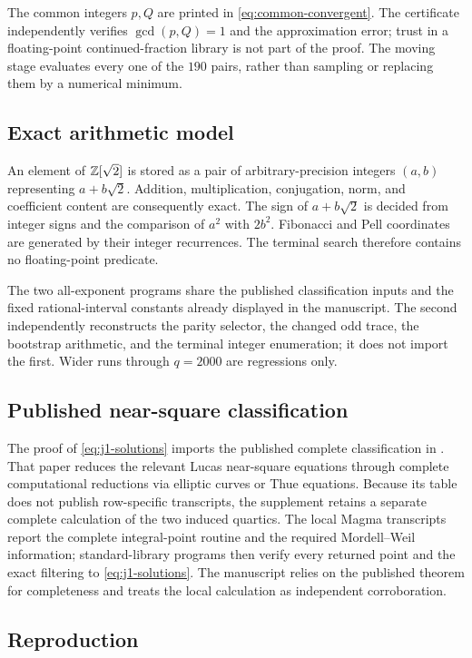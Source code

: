 The common integers $p,Q$ are printed in \cref{eq:common-convergent}. The
certificate independently verifies $\gcd(p,Q)=1$ and the approximation error;
trust in a floating-point continued-fraction library is not part of the proof.
The moving stage evaluates every one of the $190$ pairs, rather than sampling
or replacing them by a numerical minimum.

\subsection{Exact arithmetic model}

An element of $\mathbb{Z}[\sqrt2]$ is stored as a pair of arbitrary-precision
integers $(a,b)$ representing $a+b\sqrt2$. Addition, multiplication,
conjugation, norm, and coefficient content are consequently exact. The sign
of $a+b\sqrt2$ is decided from integer signs and the comparison of $a^2$
with $2b^2$. Fibonacci and Pell coordinates are generated by their integer
recurrences. The terminal search therefore contains no floating-point
predicate.

The two all-exponent programs share the published classification inputs and
the fixed rational-interval constants already displayed in the manuscript.
The second independently reconstructs the parity selector, the changed odd
trace, the bootstrap arithmetic, and the terminal integer enumeration; it
does not import the first. Wider runs through $q=2000$ are regressions only.

\subsection{Published near-square classification}

The proof of \cref{eq:j1-solutions} imports the published complete
classification in \cite[Table~1]{AlekseyevTengely2014}. That paper reduces
the relevant Lucas near-square equations through complete computational
reductions via elliptic curves or Thue equations. Because its table does not
publish row-specific transcripts,
the supplement retains a separate complete calculation of the two induced
quartics. The local Magma transcripts report the complete integral-point
routine and the required Mordell--Weil information; standard-library
programs then verify every returned point and the exact filtering to
\cref{eq:j1-solutions}. The manuscript relies on the published theorem for
completeness and treats the local calculation as independent corroboration.

\subsection{Reproduction}

